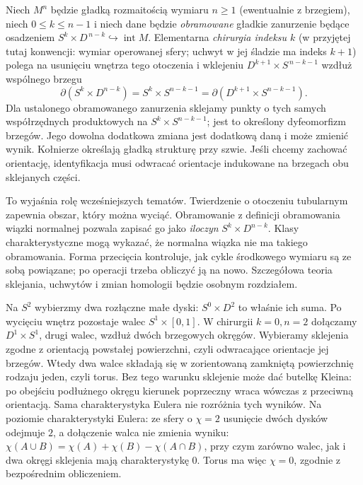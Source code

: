 \begin{definicja}
\label{def:chirurgia-zarys-16}
Niech $M^n$ będzie gładką rozmaitością
wymiaru $n\geq1$ (ewentualnie z brzegiem),
niech $0\leq k\leq n-1$ i niech dane będzie
\emph{obramowane} gładkie zanurzenie będące
osadzeniem
$S^k\times D^{\,n-k}
\hookrightarrow\operatorname{int}M$.
Elementarna
\emph{chirurgia indeksu $k$} (w przyjętej tutaj
konwencji: wymiar operowanej sfery; uchwyt w jej
śladzie ma indeks $k+1$) polega na usunięciu
wnętrza tego
otoczenia i
wklejeniu
$D^{k+1}\times
S^{\,n-k-1}$
wzdłuż wspólnego brzegu
\[
 \partial(S^k\times D^{n-k})
 =S^k\times S^{n-k-1}
 =\partial(D^{k+1}\times S^{n-k-1}).
\]
Dla ustalonego obramowanego zanurzenia sklejamy
punkty o tych samych współrzędnych produktowych na
$S^k\times S^{n-k-1}$; jest to określony dyfeomorfizm
brzegów. Jego dowolna dodatkowa zmiana jest dodatkową
daną i może zmienić wynik. Kołnierze określają gładką
strukturę przy szwie. Jeśli chcemy zachować orientację,
identyfikacja musi odwracać orientacje indukowane
na brzegach obu sklejanych części.
\end{definicja}

To wyjaśnia rolę
wcześniejszych tematów.
Twierdzenie o otoczeniu
tubularnym zapewnia
obszar, który można
wyciąć. Obramowanie
z definicji obramowania wiązki normalnej
pozwala zapisać go
jako \emph{iloczyn}
$S^k\times D^{n-k}$.
Klasy charakterystyczne
mogą wykazać, że
normalna wiązka
nie ma takiego
obramowania.
Forma przecięcia
kontroluje, jak
cykle środkowego
wymiaru są ze sobą
powiązane; po
operacji trzeba
obliczyć ją na nowo.
Szczegółowa teoria
sklejania, uchwytów
i zmian homologii
będzie osobnym
rozdziałem.

\begin{przyklad}
Na $S^2$ wybierzmy
dwa rozłączne
małe dyski:
$S^0\times D^2$
to właśnie ich suma.
Po wycięciu wnętrz
pozostaje walec
$S^1\times[0,1]$.
W chirurgii
$k=0,n=2$
dołączamy
$D^1\times S^1$,
drugi walec,
wzdłuż dwóch
brzegowych okręgów.
Wybieramy sklejenia zgodne z orientacją powstałej
powierzchni, czyli odwracające orientacje jej brzegów.
Wtedy dwa walce składają się w zorientowaną zamkniętą
powierzchnię rodzaju jeden, czyli torus. Bez tego
warunku sklejenie może dać butelkę Kleina:
po obejściu podłużnego okręgu kierunek poprzeczny
wraca wówczas z przeciwną orientacją. Sama
charakterystyka Eulera nie rozróżnia tych wyników.
Na poziomie
charakterystyki
Eulera: ze sfery
o $\chi=2$ usunięcie
dwóch dysków
odejmuje $2$,
a dołączenie walca nie zmienia wyniku:
$\chi(A\cup B)=\chi(A)+\chi(B)-\chi(A\cap B)$,
przy czym zarówno walec, jak i dwa okręgi sklejenia
mają charakterystykę $0$.
Torus ma więc
$\chi=0$, zgodnie
z bezpośrednim
obliczeniem.
\end{przyklad}

